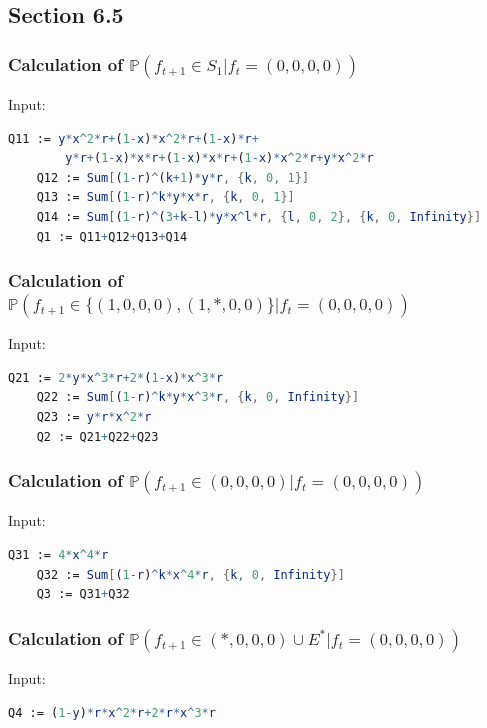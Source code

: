 \documentclass[11pt]{article}
\theoremstyle{plain}
\theoremstyle{definition}
\theoremstyle{remark}
\begin{document}
\subsection*{Section 6.5}

\subsubsection*{Calculation of $\mathbb{P}(f_{t+1} \in S_1 | f_t = (0, 0, 0, 0))$}

Input:
\begin{lstlisting}[language= Mathematica]
	Q11 := y*x^2*r+(1-x)*x^2*r+(1-x)*r+
		y*r+(1-x)*x*r+(1-x)*x*r+(1-x)*x^2*r+y*x^2*r
	Q12 := Sum[(1-r)^(k+1)*y*r, {k, 0, 1}]
	Q13 := Sum[(1-r)^k*y*x*r, {k, 0, 1}]
	Q14 := Sum[(1-r)^(3+k-l)*y*x^l*r, {l, 0, 2}, {k, 0, Infinity}]
	Q1 := Q11+Q12+Q13+Q14
\end{lstlisting}

\subsubsection*{Calculation of $\mathbb{P}(f_{t+1} \in \{(1, 0, 0, 0), (1, *, 0, 0)\} | f_t = (0, 0, 0, 0))$}

Input:
\begin{lstlisting}[language= Mathematica]
	Q21 := 2*y*x^3*r+2*(1-x)*x^3*r
	Q22 := Sum[(1-r)^k*y*x^3*r, {k, 0, Infinity}]
	Q23 := y*r*x^2*r
	Q2 := Q21+Q22+Q23
\end{lstlisting}

\subsubsection*{Calculation of $\mathbb{P}(f_{t+1} \in (0, 0, 0, 0) | f_t = (0, 0, 0, 0))$}

Input:
\begin{lstlisting}[language= Mathematica]
	Q31 := 4*x^4*r 
	Q32 := Sum[(1-r)^k*x^4*r, {k, 0, Infinity}]
	Q3 := Q31+Q32
\end{lstlisting}

\subsubsection*{Calculation of $\mathbb{P}(f_{t+1} \in (*, 0, 0, 0)\cup E^*| f_t = (0, 0, 0, 0))$}

Input:
\begin{lstlisting}[language= Mathematica]
	Q4 := (1-y)*r*x^2*r+2*r*x^3*r
\end{lstlisting}
\end{document}
